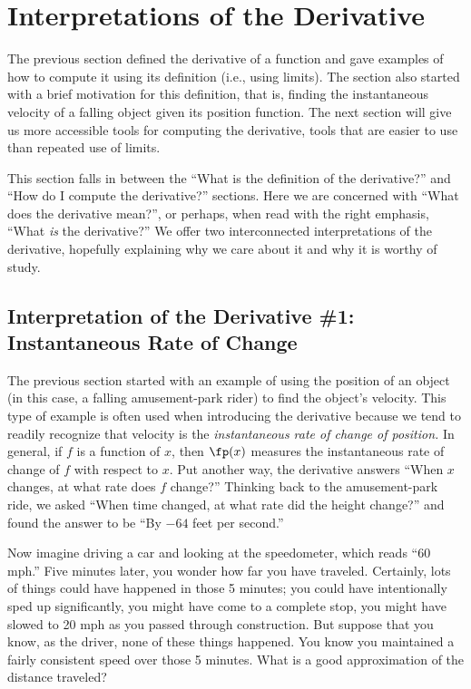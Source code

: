 \section{Interpretations of the Derivative}\label{sec:interp_deriv}

The previous section defined the derivative of a function and gave examples of how to compute it using its definition (i.e., using limits). The section also started with a brief motivation for this definition, that is, finding the instantaneous velocity of a falling object given its position function. The next section will give us more accessible tools for computing the derivative, tools that are easier to use than repeated use of limits.

This section falls in between the ``What is the definition of the derivative?'' and ``How do I compute the derivative?'' sections. Here we are concerned with ``What does the derivative mean?'', or perhaps, when read with the right emphasis, ``What \textit{is} the derivative?'' We offer two interconnected interpretations of the derivative, hopefully explaining why we care about it and why it is worthy of study.

\subsection{Interpretation of the Derivative \#1: Instantaneous Rate of Change}

The previous section started with an example of using the position of an object (in this case, a falling amusement-park rider) to find the object's velocity. This type of example is often used when introducing the derivative because we tend to readily recognize that velocity is the \textit{instantaneous rate of change of position.} In general, if $f$ is a function of $x$, then $\fp(x)$ measures the instantaneous rate of change of $f$ with respect to $x$. Put another way, the derivative answers ``When $x$ changes, at what rate does $f$ change?'' Thinking back to the amusement-park ride, we asked ``When time changed, at what rate did the height change?'' and found the answer to be ``By $-64$ feet per second.'' 

Now imagine driving a car and looking at the speedometer, which reads ``60 mph.'' Five minutes later, you wonder how far you have traveled. Certainly, lots of things could have happened in those 5 minutes; you could have intentionally sped up significantly, you might have come to a complete stop, you might have slowed to 20 mph as you passed through construction.  But suppose that you know, as the driver, none of these things happened. You know you maintained a fairly consistent speed over those 5 minutes. What is a good approximation of the distance traveled?

